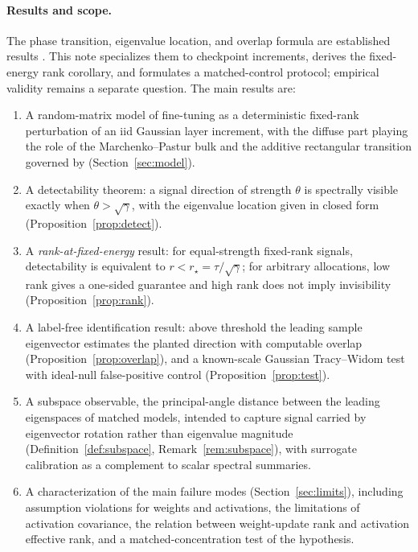 \documentclass[11pt]{article}
\theoremstyle{definition}
\theoremstyle{remark}
\begin{document}
\paragraph{Results and scope.}
The phase transition, eigenvalue location, and overlap formula are established
results \cite{benaych2012}. This note specializes them to checkpoint increments,
derives the fixed-energy rank corollary, and formulates a matched-control
protocol; empirical validity remains a separate question.
The main results are:
\begin{enumerate}[leftmargin=1.5em,itemsep=2pt]
\item A random-matrix model of fine-tuning as a deterministic fixed-rank
perturbation of an iid Gaussian layer increment, with the diffuse part playing
the role of the Marchenko--Pastur bulk \cite{marchenko1967} and the additive
rectangular transition governed by \cite{benaych2012}
(Section~\ref{sec:model}).
\item A detectability theorem: a signal direction of strength $\theta$ is spectrally
visible exactly when $\theta > \sqrt{\gamma}$, with the eigenvalue location given in
closed form (Proposition~\ref{prop:detect}).
\item A \emph{rank-at-fixed-energy} result: for equal-strength fixed-rank
signals, detectability is equivalent to $r<r_\star=\tau/\sqrt\gamma$; for
arbitrary allocations, low rank gives a one-sided guarantee and high rank does
not imply invisibility (Proposition~\ref{prop:rank}).
\item A label-free identification result: above threshold the leading sample eigenvector
estimates the planted direction with computable overlap
(Proposition~\ref{prop:overlap}), and a known-scale Gaussian Tracy--Widom test
with ideal-null false-positive control (Proposition~\ref{prop:test}).
\item A subspace observable, the principal-angle distance between the leading eigenspaces
of matched models, intended to capture signal carried by eigenvector rotation rather than
eigenvalue magnitude (Definition~\ref{def:subspace}, Remark~\ref{rem:subspace}), with
surrogate calibration as a complement to scalar spectral summaries.
\item A characterization of the main failure modes (Section~\ref{sec:limits}),
including assumption violations for weights and activations, the limitations of
activation covariance, the relation between weight-update rank and activation
effective rank, and a matched-concentration test of the hypothesis.
\end{enumerate}
\end{document}
